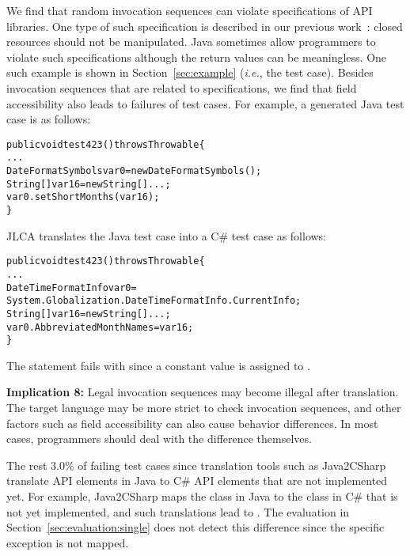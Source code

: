 We find that random invocation sequences can violate specifications of API libraries. One type of such specification is described in our previous work~\cite{zhong09:inferring}: closed resources should not be manipulated. Java sometimes allow programmers to violate such specifications although the return values can be meaningless. One such example is shown in Section~\ref{sec:example} (\emph{i.e.}, the  test case). Besides invocation sequences that are related to specifications, we find that field accessibility also leads to failures of test cases. For example, a generated Java test case is as follows:

\begin{CodeOut}\vspace*{-1ex}
\begin{alltt}
public void test423() throws Throwable\{
  ...
  DateFormatSymbols var0=new DateFormatSymbols();
  String[] var16=new String[]{...};
  var0.setShortMonths(var16);
\}
\end{alltt}
\end{CodeOut}\vspace*{-2ex}

JLCA translates the Java test case into a C\# test case as follows:

\begin{CodeOut}\vspace*{-1ex}
\begin{alltt}
public void test423() throws Throwable\{
  ...
  DateTimeFormatInfo var0 =
  System.Globalization.DateTimeFormatInfo.CurrentInfo;
  String[] var16=new String[]{...};
  var0.AbbreviatedMonthNames = var16;
\}
\end{alltt}
\end{CodeOut}\vspace*{-2ex}

The  statement fails with  since a constant value is assigned to .

\textbf{Implication 8:} Legal invocation sequences may become illegal after translation. The target language may be more strict to check invocation sequences, and other factors such as field accessibility can also cause behavior differences. In most cases, programmers should deal with the difference themselves.

The rest 3.0\% of failing test cases since translation tools such as Java2CSharp translate API elements in Java to C\# API elements that are not implemented yet. For example, Java2CSharp maps the  class in Java to the  class in C\# that is not yet implemented, and such translations lead to . The evaluation in Section~\ref{sec:evaluation:single} does not detect this difference since the specific exception is not mapped.

